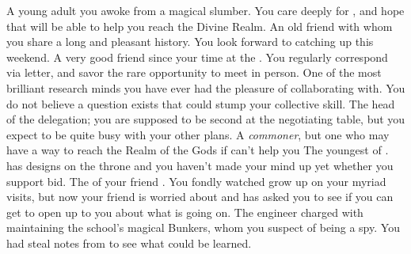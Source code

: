 \documentclass[char]{GL2020}
\begin{document}
\begin{contacts}
    \contact{\cDisney{}} A young adult you awoke from a magical slumber. You care deeply for \cDisney{\them}, and hope that \cDisney{\they} will be able to help you reach the Divine Realm.
    \contact{\cHistory{}} An old friend with whom you share a long and pleasant history. You look forward to catching up this weekend.
    \contact{\cHedonist{}} A very good friend since your time at the \pSchool{}. You regularly correspond via letter, and savor the rare opportunity to meet in person. 
    \contact{\cLibrarian{}} One of the most brilliant research minds you have ever had the pleasure of collaborating with. You do not believe a question exists that could stump your collective skill.
    \contact{\cEvil{}} The head of the \pFarm{} delegation; you are supposed to be \cEvil{\their} second at the negotiating table, but you expect to be quite busy with your other plans.
    \contact{\cCurse{}} A \emph{commoner}, but one who may have a way to reach the Realm of the Gods if \cDisney{} can’t help you
    \contact{\cPrince{}} The youngest \cPrince{\offspring} of \cQueen{\Monarch} \cQueen{}. \cPrince{} has designs on the throne and you haven’t made your mind up yet whether you support \cPrince{\their} bid.
    \contact{\cChupStudent{}} The \cChupStudent{\child} of your friend \cWildCardFriend{}. You fondly watched \cChupStudent{\them} grow up on your myriad visits, but now your friend is worried about \cChupStudent{} and has asked you to see if you can get \cChupStudent{\them} to open up to you about what is going on.
    \contact{\cBunker{}} The \pShippie{} engineer charged with maintaining the school’s magical Bunkers, whom you suspect of being a spy. You had \cDisney{} steal notes from \cBunker{\them} to see what could be learned.
\end{contacts}
\end{document}
